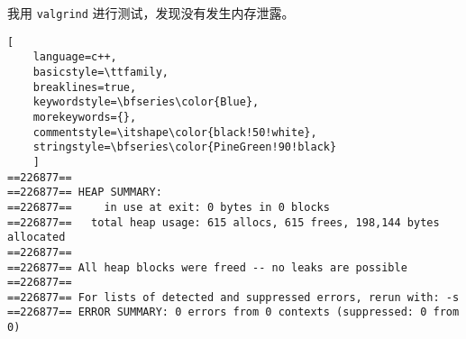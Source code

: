 \documentclass[UTF8]{ctexart}
\begin{document}
我用 \texttt{valgrind} 进行测试，发现没有发生内存泄露。
\begin{lstlisting}[ 
    language=c++,
    basicstyle=\ttfamily,
    breaklines=true,
    keywordstyle=\bfseries\color{Blue}, 
    morekeywords={}, 
    commentstyle=\itshape\color{black!50!white},
    stringstyle=\bfseries\color{PineGreen!90!black} 
    ]
==226877== 
==226877== HEAP SUMMARY:
==226877==     in use at exit: 0 bytes in 0 blocks
==226877==   total heap usage: 615 allocs, 615 frees, 198,144 bytes allocated
==226877== 
==226877== All heap blocks were freed -- no leaks are possible
==226877== 
==226877== For lists of detected and suppressed errors, rerun with: -s
==226877== ERROR SUMMARY: 0 errors from 0 contexts (suppressed: 0 from 0)    
\end{lstlisting}
\end{document}
